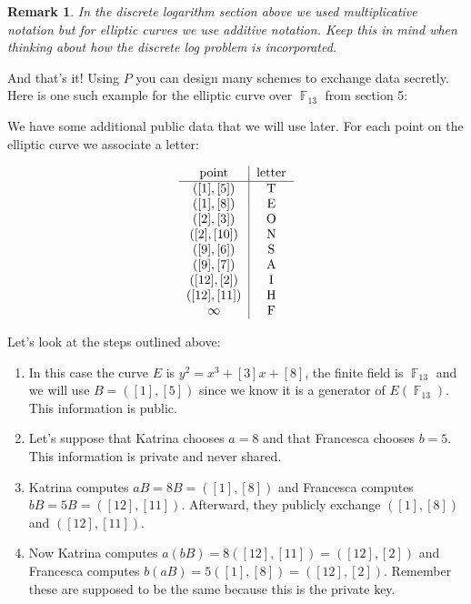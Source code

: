 \documentclass[12 pt]{article}
\newtheorem{remark}{Remark}
\DeclareMathOperator{\F}{\mathbb{F}}
\begin{document}
\begin{remark}
In the discrete logarithm section above we used multiplicative notation but for elliptic curves we use additive notation. Keep this in mind when thinking about how the discrete log problem is incorporated.
\end{remark}

And that's it! Using $P$ you can design many schemes to exchange data secretly. Here is one such example for the elliptic curve over $\F_{13}$ from section 5:

We have some additional public data that we will use later. For each point on the elliptic curve we associate a letter:

\[\begin{tabular}{c|c}
point & letter\\ \hline
$([1],[5])$ & T \\
$([1],[8])$ & E \\
$([2],[3])$ & O \\
$([2],[10])$ & N \\
$([9],[6])$ & S \\
$([9],[7])$ & A \\
$([12],[2])$ & I \\
$([12],[11])$ & H \\
$\infty$ & F \\
\end{tabular}
\]

Let's look at the steps outlined above:
\begin{enumerate}
\item In this case the curve $E$ is $y^2=x^3+[3]x+[8]$, the finite field is $\F_{13}$ and we will use $B=([1],[5])$ since we know it is a generator of $E(\F_{13})$. This information is public.

\item Let's suppose that Katrina chooses $a=8$ and that Francesca chooses $b=5$. This information is private and never shared.

\item Katrina computes $aB=8B=([1],[8])$ and Francesca computes $bB=5B=([12],[11])$. Afterward, they publicly exchange $([1],[8])$ and $([12],[11])$.

\item Now Katrina computes $a(bB)=8([12],[11])=([12],[2])$ and Francesca computes $b(aB)=5([1],[8])=([12],[2])$. Remember these are supposed to be the same because this is the private key.

\end{enumerate}
\end{document}
